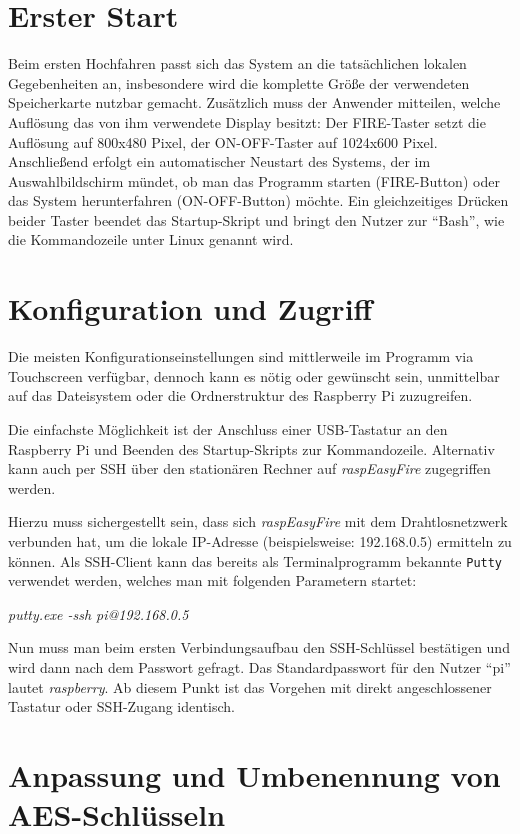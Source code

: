 \documentclass[paper=a4, parskip, numbers=noenddot, toc=listof, headsepline]{scrbook}
\newcommand{\REF}{\emph{raspEasyFire}}
\begin{document}
		\section{Erster Start}

			Beim ersten Hochfahren passt sich das System an die tatsächlichen lokalen Gegebenheiten an, insbesondere wird die komplette Größe der verwendeten Speicherkarte nutzbar gemacht. Zusätzlich muss der Anwender mitteilen, welche Auflösung das von ihm verwendete Display besitzt: Der FIRE-Taster setzt die Auflösung auf 800x480 Pixel, der ON-OFF-Taster auf 1024x600 Pixel. Anschließend erfolgt ein automatischer Neustart des Systems, der im Auswahlbildschirm mündet, ob man das Programm starten (FIRE-Button) oder das System herunterfahren (ON-OFF-Button) möchte. Ein gleichzeitiges Drücken beider Taster beendet das Startup-Skript und bringt den Nutzer zur \enquote{Bash}, wie die Kommandozeile unter Linux genannt wird.

		\section{Konfiguration und Zugriff}

			Die meisten Konfigurationseinstellungen sind mittlerweile im Programm via Touchscreen verfügbar, dennoch kann es nötig oder gewünscht sein, unmittelbar auf das Dateisystem oder die Ordnerstruktur des Raspberry Pi zuzugreifen.

			Die einfachste Möglichkeit ist der Anschluss einer USB-Tastatur an den Raspberry Pi und Beenden des Startup-Skripts zur Kommandozeile. Alternativ kann auch per SSH über den stationären Rechner auf {\REF} zugegriffen werden.

			Hierzu muss sichergestellt sein, dass sich {\REF} mit dem Drahtlosnetzwerk verbunden hat, um die lokale IP-Adresse (beispielsweise: 192.168.0.5) ermitteln zu können. Als SSH-Client kann das bereits als Terminalprogramm bekannte \texttt{Putty} verwendet werden, welches man mit folgenden Parametern startet:
			\begin{center}
				\emph{putty.exe -ssh pi@192.168.0.5}
			\end{center}

			Nun muss man beim ersten Verbindungsaufbau den SSH-Schlüssel bestätigen und wird dann nach dem Passwort gefragt. Das Standardpasswort für den Nutzer \enquote{pi} lautet \emph{raspberry}. Ab diesem Punkt ist das Vorgehen mit direkt angeschlossener Tastatur oder SSH-Zugang identisch.

		\section{Anpassung und Umbenennung von AES-Schlüsseln}
\end{document}
